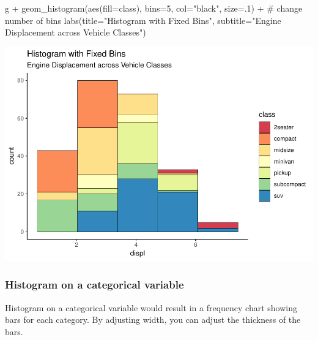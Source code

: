 \documentclass[a4paper]{article}
\newenvironment{Shaded}{}{}
\newcommand{\KeywordTok}[1]{\textcolor[rgb]{0.00,0.00,1.00}{#1}}
\newcommand{\DataTypeTok}[1]{#1}
\newcommand{\DecValTok}[1]{#1}
\newcommand{\StringTok}[1]{\textcolor[rgb]{0.00,0.50,0.50}{#1}}
\newcommand{\CommentTok}[1]{\textcolor[rgb]{0.00,0.50,0.00}{#1}}
\newcommand{\OperatorTok}[1]{#1}
\newcommand{\NormalTok}[1]{#1}
\begin{document}
\newpage 

\begin{Shaded}
\begin{Highlighting}[]
\NormalTok{g }\OperatorTok{+}\StringTok{ }\KeywordTok{geom_histogram}\NormalTok{(}\KeywordTok{aes}\NormalTok{(}\DataTypeTok{fill=}\NormalTok{class), }
                   \DataTypeTok{bins=}\DecValTok{5}\NormalTok{, }
                   \DataTypeTok{col=}\StringTok{"black"}\NormalTok{, }
                   \DataTypeTok{size=}\NormalTok{.}\DecValTok{1}\NormalTok{) }\OperatorTok{+}\StringTok{   }\CommentTok{# change number of bins}
\StringTok{  }\KeywordTok{labs}\NormalTok{(}\DataTypeTok{title=}\StringTok{"Histogram with Fixed Bins"}\NormalTok{, }
       \DataTypeTok{subtitle=}\StringTok{"Engine Displacement across Vehicle Classes"}\NormalTok{) }
\end{Highlighting}
\end{Shaded}

\includegraphics{M24-ggplot2_Gallery_files/figure-latex/unnamed-chunk-23-1.pdf}

\newpage

\subsubsection{Histogram on a categorical
variable}\label{histogram-on-a-categorical-variable}

Histogram on a categorical variable would result in a frequency chart
showing bars for each category. By adjusting width, you can adjust the
thickness of the bars.
\end{document}
